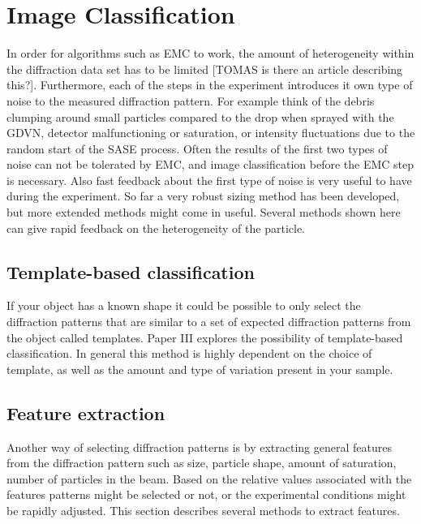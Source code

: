 \chapter{Image Classification}
In order for algorithms such as EMC to work, the amount of heterogeneity within the diffraction data set has to be limited [TOMAS is there an article describing this?]. Furthermore, each of the steps in the experiment introduces it own type of noise to the measured diffraction pattern. For example think of the debris clumping around small particles compared to the drop when sprayed with the GDVN, detector malfunctioning or saturation, or intensity fluctuations due to the random start of the SASE process. Often the results of the first two types of noise can not be tolerated by EMC, and image classification before the EMC step is necessary. Also fast feedback about the first type of noise is very useful to have during the experiment. So far a very robust sizing method has been developed, but more extended methods might come in useful. Several methods shown here can give rapid feedback on the heterogeneity of the particle.

\section{Template-based classification}
If your object has a known shape it could be possible to only select the diffraction patterns that are similar to a set of expected diffraction patterns from the object called templates. Paper III explores the possibility of template-based classification. In general this method is highly dependent on the choice of template, as well as the amount and type of variation present in your sample.

\section{Feature extraction}
Another way of selecting diffraction patterns is by extracting general features from the diffraction pattern such as size, particle shape, amount of saturation, number of particles in the beam. Based on the relative values associated with the features patterns might be selected or not, or the experimental conditions might be rapidly adjusted. This section describes several methods to extract features.

